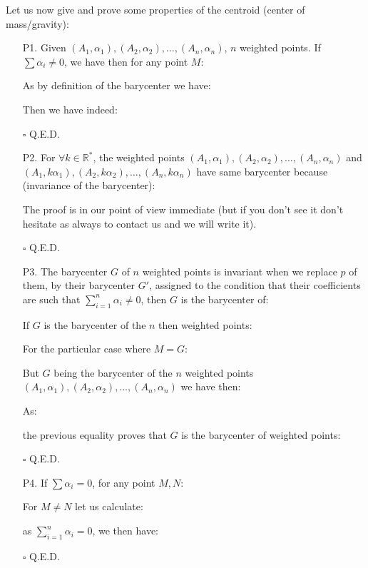 	Let us now give and prove some properties of the centroid (center of mass/gravity):
	\begin{enumerate}
		\item[P1.] Given $(A_1,\alpha_1),(A_2,\alpha_2),\ldots,(A_n,\alpha_n)$, $n$ weighted points. If $\sum\alpha_i\neq 0$, we have then for any point $M$:
		
		\begin{dem}
		
		As by definition of the barycenter we have:
		
		Then we have indeed:
		
		\begin{flushright}
			$\square$  Q.E.D.
		\end{flushright}
		\end{dem}

		\item[P2.] For $\forall k\in\mathbb{R}^{*}$, the weighted points $(A_1,\alpha_1),(A_2,\alpha_2),\ldots,(A_n,\alpha_n)$ and $(A_1,k\alpha_1),(A_2,k\alpha_2),\ldots,(A_n,k\alpha_n)$ have same barycenter because (invariance of the barycenter):
	
		\begin{dem}
		The proof is in our point of view immediate (but if you don't see it don't hesitate as always to contact us and we will write it).
		\begin{flushright}
			$\square$  Q.E.D.
		\end{flushright}
		\end{dem}

		\item[P3.] The barycenter $G$ of $n$ weighted points is invariant when we replace $p$ of them, by their barycenter $G'$, assigned to the condition that their coefficients are such that $\sum_{i=1}^n \alpha_i\neq 0$, then $G$ is the barycenter of:
		
		\begin{dem}
		If $G$ is the barycenter of the $n$ then weighted points:
		
		For the particular case where $M = G$:
		
		But $G$ being the barycenter of the $n$ weighted points $(A_1,\alpha_1),(A_2,\alpha_2),\ldots,(A_n,\alpha_n)$ we have then:
		
		As:
		
		the previous equality proves that $G$ is the barycenter of weighted points:
		
		\begin{flushright}
			$\square$  Q.E.D.
		\end{flushright}
		\end{dem}

		\item[P4.] If $\sum \alpha_i=0$, for any point $M,N$:
		
		\begin{dem}
		For $M\neq N$ let us calculate:
	
		as $\sum_{i=1}^n \alpha_i=0$, we then have:
		
		\begin{flushright}
			$\square$  Q.E.D.
		\end{flushright}
		\end{dem}
	\end{enumerate}
